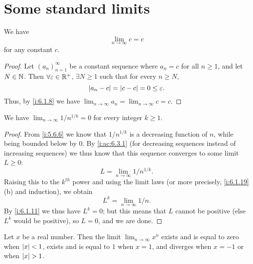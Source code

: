 \section{Some standard limits}\label{i:sec:6.5}

\begin{ac}\label{i:ac:6.5.1}
  We have
  \[
    \lim_{n \to \infty} c = c
  \]
  for any constant \(c\).
\end{ac}

\begin{proof}
  Let \((a_n)_{n = 1}^\infty\) be a constant sequence where \(a_n = c\) for all \(n \geq 1\), and let \(N \in \mathbb{N}\).
  Then \(\forall \varepsilon \in \mathbb{R}^+\), \(\exists N \geq 1\) such that for every \(n \geq N\),
  \[
    \left\lvert a_n - c\right\rvert = \left\lvert c - c\right\rvert = 0 \leq \varepsilon.
  \]
  Thus, by \cref{i:6.1.8} we have \(\lim_{n \to \infty} a_n = \lim_{n \to \infty} c = c\).
\end{proof}

\begin{cor}\label{i:6.5.1}
  We have \(\lim_{n \to \infty} 1 / n^{1 / k} = 0\) for every integer \(k \geq 1\).
\end{cor}

\begin{proof}
  From \cref{i:5.6.6} we know that \(1 / n^{1 / k}\) is a decreasing function of \(n\), while being bounded below by \(0\).
  By \cref{i:ac:6.3.1} (for decreasing sequences instead of increasing sequences) we thus know that this sequence converges to some limit \(L \geq 0\):
  \[
    L = \lim_{n \to \infty} 1 / n^{1 / k}.
  \]
  Raising this to the \(k^{th}\) power and using the limit laws (or more precisely, \cref{i:6.1.19}(b) and induction), we obtain
  \[
    L^k = \lim_{n \to \infty} 1 / n.
  \]
  By \cref{i:6.1.11} we thus have \(L^k = 0\);
  but this means that \(L\) cannot be positive (else \(L^k\) would be positive), so \(L = 0\), and we are done.
\end{proof}

\begin{lem}\label{i:6.5.2}
  Let \(x\) be a real number.
  Then the limit \(\lim_{n \to \infty} x^n\) exists and is equal to zero when \(\left\lvert x\right\rvert < 1\), exists and is equal to \(1\) when \(x = 1\), and diverges when \(x = -1\) or when \(\left\lvert x\right\rvert > 1\).
\end{lem}

